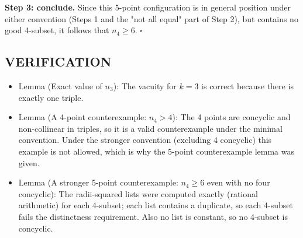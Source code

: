 \textbf{Step 3: conclude.} Since this 5-point configuration is in general position under either convention (Steps 1 and the "not all equal" part of Step 2), but contains no good 4-subset, it follows that $n_4\ge 6$.
\hfill$\square$


\subsection*{VERIFICATION}
\begin{itemize}
\item Lemma (Exact value of $n_3$): The vacuity for $k=3$ is correct because there is exactly one triple.
\item Lemma (A 4-point counterexample: $n_4>4$): The 4 points are concyclic and non-collinear in triples, so it is a valid counterexample under the minimal convention. Under the stronger convention (excluding 4 concyclic) this example is not allowed, which is why the 5-point counterexample lemma was given.
\item Lemma (A stronger 5-point counterexample: $n_4\ge 6$ even with no four concyclic): The radii-squared lists were computed exactly (rational arithmetic) for each 4-subset; each list contains a duplicate, so each 4-subset fails the distinctness requirement. Also no list is constant, so no 4-subset is concyclic.
\end{itemize}

